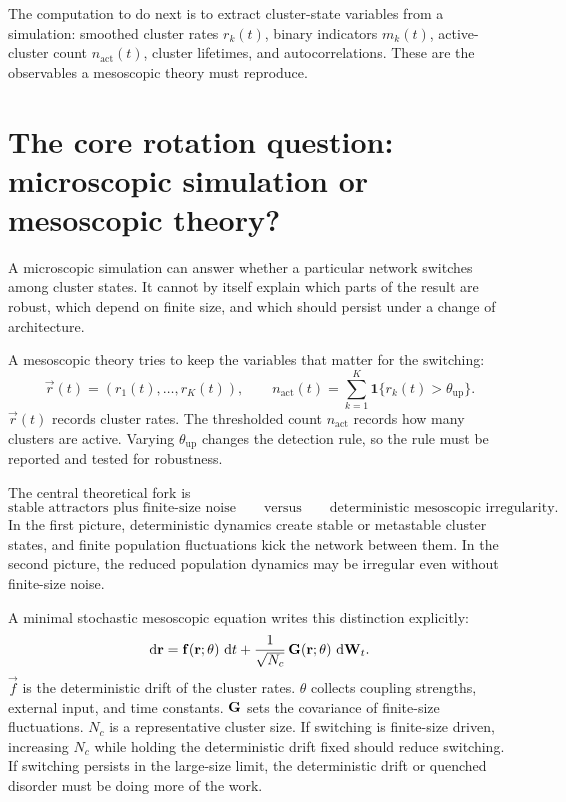 The computation to do next is to extract cluster-state variables from a simulation: smoothed cluster rates $r_k(t)$, binary indicators $m_k(t)$, active-cluster count $n_{\mathrm{act}}(t)$, cluster lifetimes, and autocorrelations. These are the observables a mesoscopic theory must reproduce.

\section{The core rotation question: microscopic simulation or mesoscopic theory?}
\label{sec:core-rotation-question}

A microscopic simulation can answer whether a particular network switches among cluster states. It cannot by itself explain which parts of the result are robust, which depend on finite size, and which should persist under a change of architecture.

A mesoscopic theory tries to keep the variables that matter for the switching:
%
\begin{equation}
  \vec r(t)
  =
  (r_1(t),\ldots,r_K(t)),
  \qquad
  n_{\mathrm{act}}(t)=\sum_{k=1}^K \mathbf{1}\{r_k(t)>\theta_{\mathrm{up}}\}.
  \label{eq:chapter1-mesoscopic-cluster-variables}
\end{equation}
%
$\vec r(t)$ records cluster rates. The thresholded count $n_{\mathrm{act}}$ records how many clusters are active. Varying $\theta_{\mathrm{up}}$ changes the detection rule, so the rule must be reported and tested for robustness.

The central theoretical fork is
%
\begin{equation}
  \text{stable attractors plus finite-size noise}
  \qquad
  \text{versus}
  \qquad
  \text{deterministic mesoscopic irregularity}.
  \label{eq:chapter1-theory-fork}
\end{equation}
%
In the first picture, deterministic dynamics create stable or metastable cluster states, and finite population fluctuations kick the network between them. In the second picture, the reduced population dynamics may be irregular even without finite-size noise.

A minimal stochastic mesoscopic equation writes this distinction explicitly:
%
\begin{equation}
  \mathop{}\!\mathrm{d} \mathbf{r}
  =
  \mathbf{f}(\mathbf{r};\theta)\,\mathop{}\!\mathrm{d} t
  +
  \frac{1}{\sqrt{N_c}}\,
  \mathbf{G}(\mathbf{r};\theta)\,\mathop{}\!\mathrm{d} \mathbf{W}_t .
  \label{eq:chapter1-mesoscopic-sde}
\end{equation}
%
$\vec f$ is the deterministic drift of the cluster rates. $\theta$ collects coupling strengths, external input, and time constants. $\mathbf{G}$ sets the covariance of finite-size fluctuations. $N_c$ is a representative cluster size. If switching is finite-size driven, increasing $N_c$ while holding the deterministic drift fixed should reduce switching. If switching persists in the large-size limit, the deterministic drift or quenched disorder must be doing more of the work.

